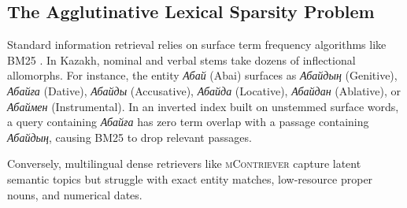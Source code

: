 \subsection{The Agglutinative Lexical Sparsity Problem}
Standard information retrieval relies on surface term frequency algorithms like BM25 \citep{robertson2009bm25}. In Kazakh, nominal and verbal stems take dozens of inflectional allomorphs. For instance, the entity \textit{Абай} (Abai) surfaces as \textit{Абайдың} (Genitive), \textit{Абайға} (Dative), \textit{Абайды} (Accusative), \textit{Абайда} (Locative), \textit{Абайдан} (Ablative), or \textit{Абаймен} (Instrumental). In an inverted index built on unstemmed surface words, a query containing \textit{Абайға} has zero term overlap with a passage containing \textit{Абайдың}, causing BM25 to drop relevant passages.

Conversely, multilingual dense retrievers like \textsc{mContriever} \citep{izacard2021contriever} capture latent semantic topics but struggle with exact entity matches, low-resource proper nouns, and numerical dates.

